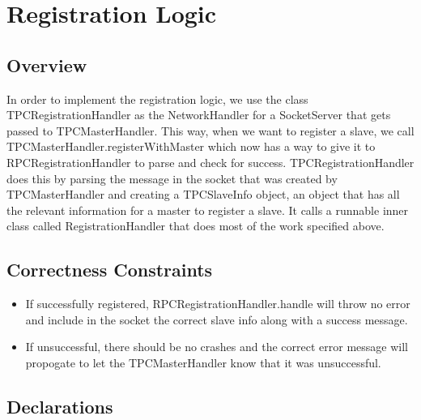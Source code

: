 \section{Registration Logic}
\subsection{Overview}
In order to implement the registration logic, we use the class TPCRegistrationHandler as the NetworkHandler for a SocketServer that gets passed to TPCMasterHandler. This way, when we want to register a slave, we call TPCMasterHandler.registerWithMaster which now has a way to give it to RPCRegistrationHandler to parse and check for success. TPCRegistrationHandler does this by parsing the message in the socket that was created by TPCMasterHandler and creating a TPCSlaveInfo object, an object that has all the relevant information for a master to register a slave. It calls a runnable inner class called RegistrationHandler that does most of the work specified above.
\subsection{Correctness Constraints}
\begin{itemize}
\item If successfully registered, RPCRegistrationHandler.handle will throw no error and include in the socket the correct slave info along with a success message.
\item If unsuccessful, there should be no crashes and the correct error message will propogate to let the TPCMasterHandler know that it was unsuccessful.
\end{itemize}
\subsection{Declarations}

